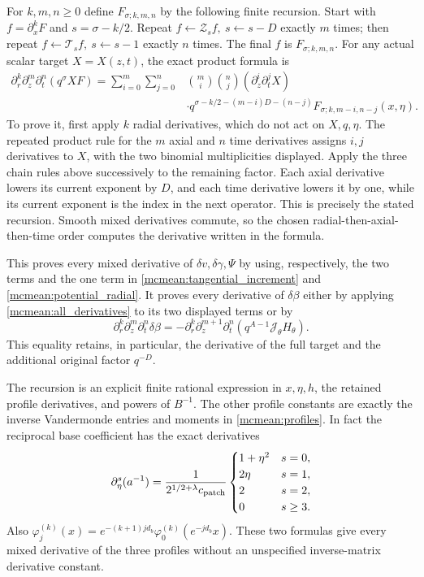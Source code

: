 For \(k,m,n\ge0\) define \(F_{\sigma;k,m,n}\) by the following
finite recursion. Start with \(f=\partial_x^kF\) and
\(s=\sigma-k/2\). Repeat
\(f\leftarrow\mathcal Z_s f,\ s\leftarrow s-D\) exactly \(m\)
times; then repeat \(f\leftarrow\mathcal T_s f,\ s\leftarrow s-1\)
exactly \(n\) times. The final \(f\) is \(F_{\sigma;k,m,n}\).
For any actual scalar target \(X=X(z,t)\), the exact product formula is
\begin{equation}\label{mcmean:all_derivatives}
\begin{split}
 \partial_r^k\partial_z^m\partial_t^n(q^\sigma XF)
  =\sum_{i=0}^m\sum_{j=0}^n&\binom mi\binom nj
     (\partial_z^i\partial_t^jX)\\
  &\cdot q^{\sigma-k/2-(m-i)D-(n-j)}
       F_{\sigma;k,m-i,n-j}(x,\eta).
\end{split}
\end{equation}
To prove it, first apply \(k\) radial derivatives, which do not act
on \(X,q,\eta\). The repeated product rule for the \(m\) axial and
\(n\) time derivatives assigns \(i,j\) derivatives to \(X\), with
the two binomial multiplicities displayed. Apply the three chain
rules above successively to the remaining factor. Each axial
derivative lowers its current exponent by \(D\), and each time
derivative lowers it by one, while its current exponent is the index
in the next operator. This is precisely the stated recursion.
Smooth mixed derivatives commute, so the chosen radial-then-axial-
then-time order computes the derivative written in the formula.

This proves every mixed derivative of \(\delta v,\delta\gamma,\Psi\)
by using, respectively, the two terms and the one term in
\eqref{mcmean:tangential_increment} and \eqref{mcmean:potential_radial}.
It proves every derivative of \(\delta\beta\) either by applying
\eqref{mcmean:all_derivatives} to its two displayed terms or by
\begin{equation}\label{mcmean:radial_all_derivatives}
 \partial_r^k\partial_z^m\partial_t^n\delta\beta
 =-\partial_r^k\partial_z^{m+1}\partial_t^n
          (q^{A-1}\mathcal J_\theta H_\theta).
\end{equation}
This equality retains, in particular, the derivative of the full
target and the additional original factor \(q^{-D}\).

The recursion is an explicit finite rational expression in
\(x,\eta,h\), the retained profile derivatives, and powers of
\(B^{-1}\). The other profile constants are exactly the inverse
Vandermonde entries and moments in \eqref{mcmean:profiles}.
In fact the reciprocal base coefficient has the exact derivatives
\begin{equation}\label{mcmean:reciprocal_a}
 \partial_\eta^s(a^{-1})=
 \frac{1}{2^{1/2+\lambda}c_{\rm patch}}
 \begin{cases}1+\eta^2&s=0,\\2\eta&s=1,\\2&s=2,\\0&s\ge3.
 \end{cases}
\end{equation}
Also \(\varphi_j^{(k)}(x)=e^{-(k+1)jd_b}
\varphi_0^{(k)}(e^{-jd_b}x)\).
These two formulas give every mixed derivative of the three profiles
without an unspecified inverse-matrix derivative constant.

